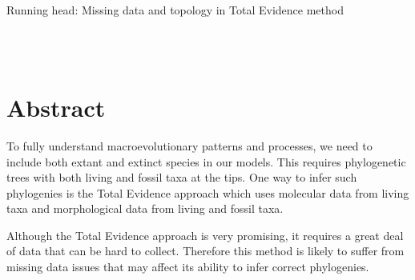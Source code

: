 \documentclass[12pt,letterpaper]{article}
\begin{document}
\vspace*{0.35in}

\begin{flushright}
\end{flushright}
\bigskip
\noindent Running head: Missing data and topology in Total Evidence method

\bigskip
\medskip
\begin{center}


\bigskip

\\
\\
\end{center}

\vspace{1in}

\modulolinenumbers[1]
\linenumbers

\newpage
\section* {Abstract}
To fully understand macroevolutionary patterns and processes, we need to include both extant and extinct species in our models.
This requires phylogenetic trees with both living and fossil taxa at the tips.
One way to infer such phylogenies is the Total Evidence approach which uses molecular data from living taxa and morphological data from living and fossil taxa.

Although the Total Evidence approach is very promising, it requires a great deal of data that can be hard to collect.
Therefore this method is likely to suffer from missing data issues that may affect its ability to infer correct phylogenies.
\end{document}
